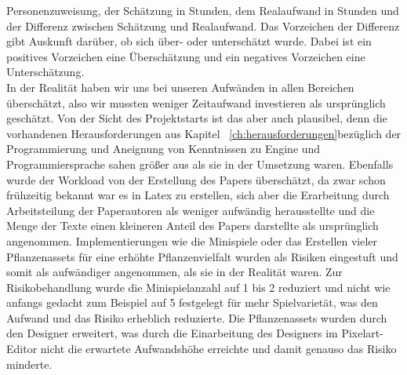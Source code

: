 Personenzuweisung, der Schätzung in Stunden, dem Realaufwand in Stunden und der Differenz zwischen Schätzung und
Realaufwand.
Das Vorzeichen der Differenz gibt Auskunft darüber, ob sich über- oder unterschätzt wurde.
Dabei ist ein positives Vorzeichen eine Überschätzung und ein negatives Vorzeichen eine Unterschätzung.\\
\newline
In der Realität haben wir uns bei unseren Aufwänden in allen Bereichen überschätzt, also wir mussten weniger
Zeitaufwand investieren als ursprünglich geschätzt. 
Von der Sicht des Projektstarts ist das aber auch plausibel, denn die vorhandenen Herausforderungen aus Kapitel
~\ref{ch:herausforderungen}bezüglich der Programmierung und Aneignung von Kenntnissen zu Engine und Programmiersprache
sahen größer aus als sie in der Umsetzung waren.
Ebenfalls wurde der Workload von der Erstellung des Papers überschätzt, da zwar schon frühzeitig bekannt war es in Latex
zu erstellen, sich aber die Erarbeitung durch Arbeitsteilung der Paperautoren als weniger aufwändig herausstellte und 
die Menge der Texte einen kleineren Anteil des Papers darstellte als ursprünglich angenommen.
Implementierungen wie die Minispiele oder das Erstellen vieler Pflanzenassets für eine erhöhte Pflanzenvielfalt wurden 
als Risiken eingestuft und somit als aufwändiger angenommen, als sie in der Realität waren. 
Zur Risikobehandlung wurde die Minispielanzahl auf 1 bis 2 reduziert und nicht wie anfangs gedacht zum Beispiel auf 5 
festgelegt für mehr Spielvarietät, was den Aufwand und das Risiko erheblich reduzierte.
Die Pflanzenassets wurden durch den Designer erweitert, was durch die Einarbeitung des Designers im Pixelart-Editor 
nicht die erwartete Aufwandshöhe erreichte und damit genauso das Risiko minderte.\\ 
